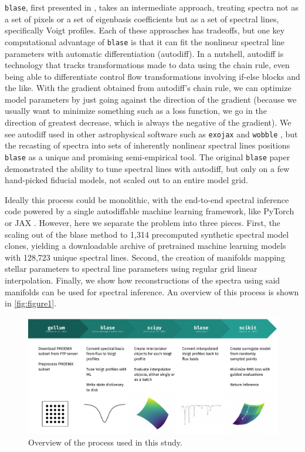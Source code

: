 \documentclass[twocolumn]{aastex631}
\begin{document}
\texttt{blase}, first presented in \citealt{blase}, takes an intermediate approach, treating spectra not as a set of pixels or a set of eigenbasis coefficients but as a set of spectral lines, specifically Voigt profiles.
Each of these approaches has tradeoffs, but one key computational advantage of  \texttt{blase} is that it can fit the nonlinear spectral line parameters with automatic differentiation (autodiff).
In a nutshell, autodiff is technology that tracks transformations made to data using the chain rule, even being able to differentiate control flow transformations involving if-else blocks and the like.
With the gradient obtained from autodiff's chain rule, we can optimize model parameters by just going against the direction of the gradient (because we usually want to minimize something such as a loss function, we go in the direction of greatest decrease, which is always the negative of the gradient).
We see autodiff used in other astrophysical software such as \texttt{exojax} and \texttt{wobble} \citep{exojax, wobble}, but the recasting of spectra into sets of inherently nonlinear spectral lines positions \texttt{blase} as a unique and promising semi-empirical tool.
The original \texttt{blase} paper demonstrated the ability to tune spectral lines with autodiff, but only on a few hand-picked fiducial models, not scaled out to an entire model grid.

Ideally this process could be monolithic, with the end-to-end spectral inference code powered by a single autodiffable machine learning framework, like PyTorch or JAX \citep{pytorch, jax}. 
However, here we separate the problem into three pieces. 
First, the scaling out of the blase method to 1,314 precomputed synthetic spectral model clones, yielding a downloadable archive of pretrained machine learning models with 128,723 unique spectral lines. 
Second, the creation of manifolds mapping stellar parameters to spectral line parameters using regular grid linear interpolation. 
Finally, we show how reconstructions of the spectra using said manifolds can be used for spectral inference.
An overview of this process is shown in \autoref{fig:figure1}.
\begin{figure}
    \centering
    \includegraphics[width=\textwidth]{figure1}
    \caption{Overview of the process used in this study.}
    \label{fig:figure1}
\end{figure}
\end{document}
